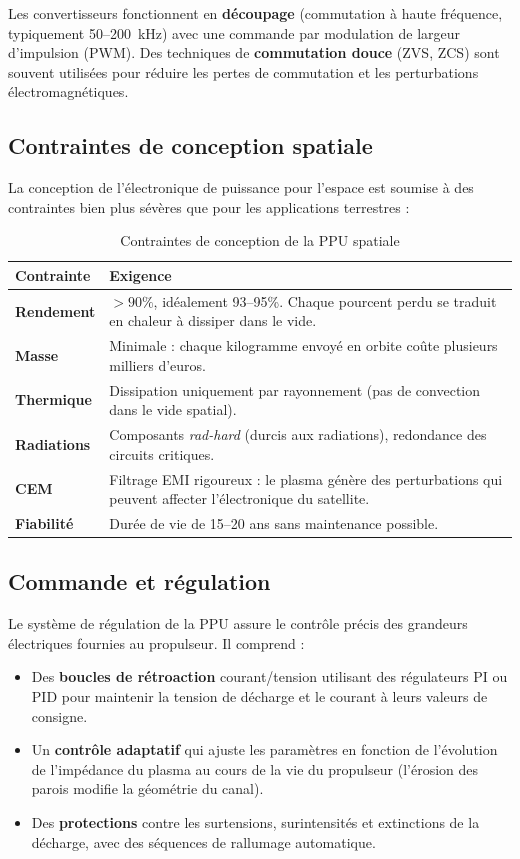 \documentclass[12pt,a4paper]{article}
\begin{document}
Les convertisseurs fonctionnent en \textbf{découpage} (commutation à haute fréquence, typiquement 50--200~kHz) avec une commande par modulation de largeur d'impulsion (PWM). Des techniques de \textbf{commutation douce} (ZVS, ZCS) sont souvent utilisées pour réduire les pertes de commutation et les perturbations électromagnétiques.

\subsection{Contraintes de conception spatiale}

La conception de l'électronique de puissance pour l'espace est soumise à des contraintes bien plus sévères que pour les applications terrestres :

\begin{table}[H]
\centering
\caption{Contraintes de conception de la PPU spatiale}
\begin{tabular}{>{\bfseries}l p{9cm}}
\toprule
Contrainte & Exigence \\
\midrule
Rendement & $> 90\%$, idéalement 93--95\%. Chaque pourcent perdu se traduit en chaleur à dissiper dans le vide. \\
Masse & Minimale : chaque kilogramme envoyé en orbite coûte plusieurs milliers d'euros. \\
Thermique & Dissipation uniquement par rayonnement (pas de convection dans le vide spatial). \\
Radiations & Composants \textit{rad-hard} (durcis aux radiations), redondance des circuits critiques. \\
CEM & Filtrage EMI rigoureux : le plasma génère des perturbations qui peuvent affecter l'électronique du satellite. \\
Fiabilité & Durée de vie de 15--20 ans sans maintenance possible. \\
\bottomrule
\end{tabular}
\end{table}

\subsection{Commande et régulation}

Le système de régulation de la PPU assure le contrôle précis des grandeurs électriques fournies au propulseur. Il comprend :

\begin{itemize}
    \item Des \textbf{boucles de rétroaction} courant/tension utilisant des régulateurs PI ou PID pour maintenir la tension de décharge et le courant à leurs valeurs de consigne.
    \item Un \textbf{contrôle adaptatif} qui ajuste les paramètres en fonction de l'évolution de l'impédance du plasma au cours de la vie du propulseur (l'érosion des parois modifie la géométrie du canal).
    \item Des \textbf{protections} contre les surtensions, surintensités et extinctions de la décharge, avec des séquences de rallumage automatique.
\end{itemize}
\end{document}
